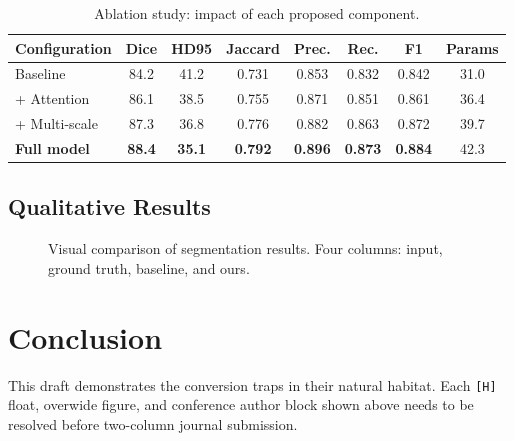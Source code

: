 \documentclass[journal,12pt,draftclsnofoot,onecolumn]{IEEEtran}
\begin{document}
\begin{table}[H]
\centering
\caption{Ablation study: impact of each proposed component.}
\label{tab:ablation}
\begin{tabular}{lccccccc}
\toprule
Configuration       & Dice & HD95  & Jaccard & Prec. & Rec.  & F1    & Params \\
\midrule
Baseline            & 84.2 & 41.2  & 0.731   & 0.853 & 0.832 & 0.842 & 31.0   \\
+ Attention         & 86.1 & 38.5  & 0.755   & 0.871 & 0.851 & 0.861 & 36.4   \\
+ Multi-scale       & 87.3 & 36.8  & 0.776   & 0.882 & 0.863 & 0.872 & 39.7   \\
\textbf{Full model} & \textbf{88.4} & \textbf{35.1} & \textbf{0.792}
                    & \textbf{0.896} & \textbf{0.873} & \textbf{0.884} & 42.3 \\
\bottomrule
\end{tabular}
\end{table}

\subsection{Qualitative Results}
\lipsum[8]

\begin{figure}[H]
\centering
\fbox{\rule{0pt}{1.5in}\rule{0.92\textwidth}{0pt}}
\caption{Visual comparison of segmentation results.
         Four columns: input, ground truth, baseline, and ours.}
\label{fig:qualitative}
\end{figure}

\section{Conclusion}
This draft demonstrates the conversion traps in their natural habitat.
Each \texttt{[H]} float, overwide figure, and conference author block
shown above needs to be resolved before two-column journal submission.
\lipsum[9]
\end{document}
